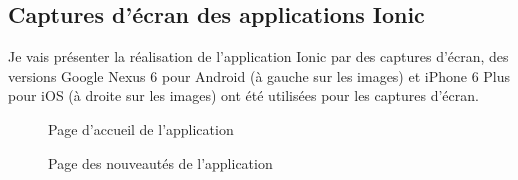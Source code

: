 \documentclass[a4paper, 12pt]{article}
\begin{document}
\subsection{Captures d'écran des applications Ionic}
Je vais présenter la réalisation de l'application Ionic par des captures d'écran, des versions Google Nexus 6
pour Android (à gauche sur les images) et iPhone 6 Plus pour iOS (à droite sur les images) ont été utilisées pour les
captures d'écran.
\begin{figure}
    \begin{center}
    \end{center}
    \caption{Page d'accueil de l'application}
\end{figure}
\begin{figure}
    \begin{center}
    \end{center}
    \caption{Page des nouveautés de l'application}
\end{figure}
\end{document}
